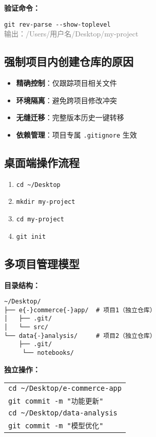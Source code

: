 \textbf{验证命令：}
\begin{center}
    \texttt{git rev-parse {-}{-}show{-}toplevel} \\
    \textcolor{gray}{输出：/Users/用户名/Desktop/my-project}
\end{center}

\subsection{强制项目内创建仓库的原因}
\begin{itemize}[leftmargin=*, nosep]
    \item \textbf{精确控制}：仅跟踪项目相关文件
    \item \textbf{环境隔离}：避免跨项目修改冲突
    \item \textbf{无缝迁移}：完整版本历史一键转移
    \item \textbf{依赖管理}：项目专属 \texttt{.gitignore} 生效
\end{itemize}

\subsection{桌面端操作流程}
\begin{enumerate}[leftmargin=*, nosep]
    \item \texttt{cd \textasciitilde/Desktop}
    \item \texttt{mkdir my{-}project}
    \item \texttt{cd my{-}project}
    \item \texttt{git init}
\end{enumerate}

\subsection{多项目管理模型}
\textbf{目录结构：}
\begin{verbatim}
~/Desktop/
├── e{-}commerce{-}app/  # 项目1（独立仓库）
│   ├── .git/
│   └── src/
└── data{-}analysis/     # 项目2（独立仓库）
    ├── .git/
     └── notebooks/
\end{verbatim}

\textbf{独立操作：}
\begin{tabular}{@{}l@{}}
    \texttt{cd \textasciitilde/Desktop/e{-}commerce{-}app} \\
    \texttt{git commit -m "功能更新"} \\[0.5em]
    \texttt{cd \textasciitilde/Desktop/data{-}analysis} \\
    \texttt{git commit -m "模型优化"}
\end{tabular}

